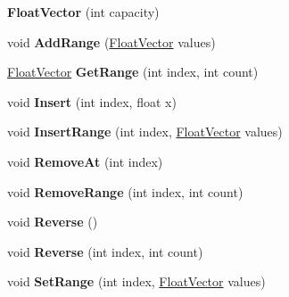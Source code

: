 \begin{DoxyCompactItemize}
\item 
\hypertarget{class_float_vector_a98bf1547be54526f334f3584931caeed}{{\bfseries Float\+Vector} (int capacity)}\label{class_float_vector_a98bf1547be54526f334f3584931caeed}

\item 
\hypertarget{class_float_vector_a9069d1258023818800fd7947e85e449e}{void {\bfseries Add\+Range} (\hyperlink{class_float_vector}{Float\+Vector} values)}\label{class_float_vector_a9069d1258023818800fd7947e85e449e}

\item 
\hypertarget{class_float_vector_aaf1385e788341d9bc9855db0fa1e3f9f}{\hyperlink{class_float_vector}{Float\+Vector} {\bfseries Get\+Range} (int index, int count)}\label{class_float_vector_aaf1385e788341d9bc9855db0fa1e3f9f}

\item 
\hypertarget{class_float_vector_aaf1cb235eb4c17e57d73216c42cb1e12}{void {\bfseries Insert} (int index, float x)}\label{class_float_vector_aaf1cb235eb4c17e57d73216c42cb1e12}

\item 
\hypertarget{class_float_vector_af7f83f6c1fbe51c33ec47dd3b969159a}{void {\bfseries Insert\+Range} (int index, \hyperlink{class_float_vector}{Float\+Vector} values)}\label{class_float_vector_af7f83f6c1fbe51c33ec47dd3b969159a}

\item 
\hypertarget{class_float_vector_a63f0e4cf5518e5e49c9f74b850322d66}{void {\bfseries Remove\+At} (int index)}\label{class_float_vector_a63f0e4cf5518e5e49c9f74b850322d66}

\item 
\hypertarget{class_float_vector_a06cdd6630082821866ec8d9d708f007a}{void {\bfseries Remove\+Range} (int index, int count)}\label{class_float_vector_a06cdd6630082821866ec8d9d708f007a}

\item 
\hypertarget{class_float_vector_ad384cab2f4ea8ae78d5002c24e906b37}{void {\bfseries Reverse} ()}\label{class_float_vector_ad384cab2f4ea8ae78d5002c24e906b37}

\item 
\hypertarget{class_float_vector_a6e3fa24bb7d5a631a4153a50982fd74d}{void {\bfseries Reverse} (int index, int count)}\label{class_float_vector_a6e3fa24bb7d5a631a4153a50982fd74d}

\item 
\hypertarget{class_float_vector_ab7f453ca924112ecb93f43320b155fb7}{void {\bfseries Set\+Range} (int index, \hyperlink{class_float_vector}{Float\+Vector} values)}\label{class_float_vector_ab7f453ca924112ecb93f43320b155fb7}


\end{DoxyCompactItemize}
